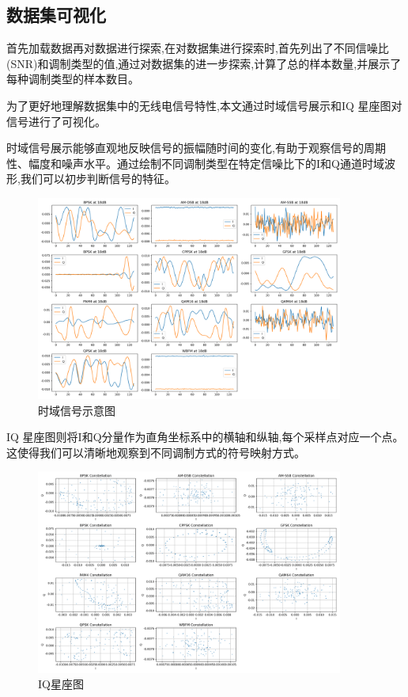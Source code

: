 \documentclass{article}
\begin{document}
\begin{CJK}{UTF8}{gbsn}
\subsection{数据集可视化}
首先加载数据再对数据进行探索,在对数据集进行探索时,首先列出了不同信噪比(SNR)和调制类型的值,通过对数据集的进一步探索,计算了总的样本数量,并展示了每种调制类型的样本数目。

为了更好地理解数据集中的无线电信号特性,本文通过时域信号展示和IQ 星座图对信号进行了可视化。

时域信号展示能够直观地反映信号的振幅随时间的变化,有助于观察信号的周期性、幅度和噪声水平。通过绘制不同调制类型在特定信噪比下的I和Q通道时域波形,我们可以初步判断信号的特征。

\begin{figure}[H]
    \centering
    \includegraphics[width=0.9\textwidth]{figure/image6.png}
    \caption{时域信号示意图}
    \label{fig:time_domain_signal}
\end{figure}

IQ 星座图则将I和Q分量作为直角坐标系中的横轴和纵轴,每个采样点对应一个点。这使得我们可以清晰地观察到不同调制方式的符号映射方式。

\begin{figure}[H]
    \centering
    \includegraphics[width=0.9\textwidth]{figure/image7.png}
    \caption{IQ星座图}
    \label{fig:iq_constellation}
\end{figure}


\end{CJK}
\end{document}
